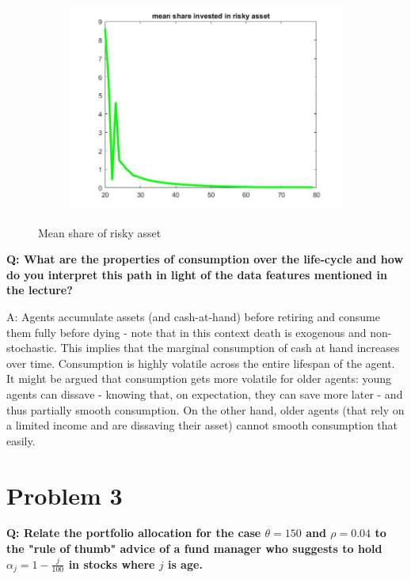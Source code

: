 \documentclass[12pt,a4paper]{article}
\begin{document}
\begin{figure}[h!]
\begin{subfigure}[b]{0.32\linewidth}
    \includegraphics[width=\linewidth]{graphs/Q2/mean_share3.jpg}
  \end{subfigure}
  \caption{Mean share of risky asset}
    \label{fig:4}
\end{figure}


\textbf{Q: What are the properties of consumption over the life-cycle and how do you interpret this path in light of the data features mentioned in the lecture?}

A: Agents accumulate assets (and cash-at-hand) before retiring and consume them fully before dying - note that in this context death is exogenous and non-stochastic. This implies that the marginal consumption of cash at hand increases over time. Consumption is highly volatile across the entire lifespan of the agent. It might be argued that consumption gets more volatile for older agents: young agents can dissave - knowing that, on expectation, they can save more later - and thus partially smooth consumption. On the other hand, older agents (that rely on a limited income and are dissaving their asset) cannot smooth consumption that easily.

\section*{Problem 3}

\textbf{Q: Relate the portfolio allocation for the case $\theta = 150$ and $\rho = 0.04$ to the "rule of thumb" advice of a fund manager who suggests to hold $\alpha_j = 1- \frac{j}{100}$ in stocks where $j$ is age.}
\end{document}
